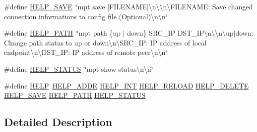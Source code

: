 \begin{DoxyCompactItemize}
\item 
\#define \hyperlink{group___mpt_help_ga4e200188b29b26838c155fb16c4975f6}{H\-E\-L\-P\-\_\-\-S\-A\-V\-E}~\char`\"{}mpt save \mbox{[}F\-I\-L\-E\-N\-A\-M\-E\mbox{]}\textbackslash{}n\textbackslash{}\textbackslash{}n\textbackslash{}\-F\-I\-L\-E\-N\-A\-M\-E\-:   Save changed connection informations to config file (Optional)\textbackslash{}n\textbackslash{}n\char`\"{}
\item 
\#define \hyperlink{group___mpt_help_gaef9b02af5c6695a80383b0fe32a99e7f}{H\-E\-L\-P\-\_\-\-P\-A\-T\-H}~\char`\"{}mpt path \{up $|$ down\} S\-R\-C\-\_\-\-I\-P D\-S\-T\-\_\-\-I\-P\textbackslash{}n\textbackslash{}\textbackslash{}n\textbackslash{}up$|$down\-:    Change path status to up or down\textbackslash{}n\textbackslash{}\-S\-R\-C\-\_\-\-I\-P\-:     I\-P address of local endpoint\textbackslash{}n\textbackslash{}\-D\-S\-T\-\_\-\-I\-P\-:     I\-P address of remote peer\textbackslash{}n\textbackslash{}n\char`\"{}
\item 
\#define \hyperlink{group___mpt_help_ga69eff6cb726be089c9475ae7428e47a0}{H\-E\-L\-P\-\_\-\-S\-T\-A\-T\-U\-S}~\char`\"{}mpt show status\textbackslash{}n\textbackslash{}n\char`\"{}
\item 
\#define \hyperlink{group___mpt_help_gae8a798ec5e0449028e485688e8241b5e}{H\-E\-L\-P}~\hyperlink{group___mpt_help_ga50c0df023791ae0a02efd91863d86efb}{H\-E\-L\-P\-\_\-\-A\-D\-D\-R} \hyperlink{group___mpt_help_gaf505be684fba1e60298c721f30b9a0d3}{H\-E\-L\-P\-\_\-\-I\-N\-T} \hyperlink{group___mpt_help_ga17ba7938d1129e4cc183c9eb077a6bee}{H\-E\-L\-P\-\_\-\-R\-E\-L\-O\-A\-D} \hyperlink{group___mpt_help_ga6973c6a7b80a84245dfe8292715f303f}{H\-E\-L\-P\-\_\-\-D\-E\-L\-E\-T\-E} \hyperlink{group___mpt_help_ga4e200188b29b26838c155fb16c4975f6}{H\-E\-L\-P\-\_\-\-S\-A\-V\-E} \hyperlink{group___mpt_help_gaef9b02af5c6695a80383b0fe32a99e7f}{H\-E\-L\-P\-\_\-\-P\-A\-T\-H} \hyperlink{group___mpt_help_ga69eff6cb726be089c9475ae7428e47a0}{H\-E\-L\-P\-\_\-\-S\-T\-A\-T\-U\-S}
\end{DoxyCompactItemize}


\subsection{Detailed Description}



